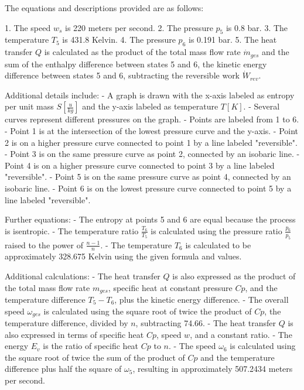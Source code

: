 The equations and descriptions provided are as follows:

1. The speed \( w_s \) is 220 meters per second.
2. The pressure \( p_5 \) is 0.8 bar.
3. The temperature \( T_5 \) is 431.8 Kelvin.
4. The pressure \( p_6 \) is 0.191 bar.
5. The heat transfer \( Q \) is calculated as the product of the total mass flow rate \( \dot{m}_{ges} \) and the sum of the enthalpy difference between states 5 and 6, the kinetic energy difference between states 5 and 6, subtracting the reversible work \( \dot{W}_{rev} \).

Additional details include:
- A graph is drawn with the x-axis labeled as entropy per unit mass \( S \left[ \frac{u}{kg} \right] \) and the y-axis labeled as temperature \( T \left[ K \right] \).
- Several curves represent different pressures on the graph.
- Points are labeled from 1 to 6.
- Point 1 is at the intersection of the lowest pressure curve and the y-axis.
- Point 2 is on a higher pressure curve connected to point 1 by a line labeled "reversible".
- Point 3 is on the same pressure curve as point 2, connected by an isobaric line.
- Point 4 is on a higher pressure curve connected to point 3 by a line labeled "reversible".
- Point 5 is on the same pressure curve as point 4, connected by an isobaric line.
- Point 6 is on the lowest pressure curve connected to point 5 by a line labeled "reversible".

Further equations:
- The entropy at points 5 and 6 are equal because the process is isentropic.
- The temperature ratio \( \frac{T_6}{T_5} \) is calculated using the pressure ratio \( \frac{p_6}{p_5} \) raised to the power of \( \frac{n-1}{n} \).
- The temperature \( T_6 \) is calculated to be approximately 328.675 Kelvin using the given formula and values.

Additional calculations:
- The heat transfer \( Q \) is also expressed as the product of the total mass flow rate \( m_{ges} \), specific heat at constant pressure \( Cp \), and the temperature difference \( T_5 - T_6 \), plus the kinetic energy difference.
- The overall speed \( \omega_{ges} \) is calculated using the square root of twice the product of \( Cp \), the temperature difference, divided by \( n \), subtracting 74.66.
- The heat transfer \( Q \) is also expressed in terms of specific heat \( Cp \), speed \( w \), and a constant ratio.
- The energy \( E_v \) is the ratio of specific heat \( Cp \) to \( n \).
- The speed \( \omega_6 \) is calculated using the square root of twice the sum of the product of \( Cp \) and the temperature difference plus half the square of \( \omega_5 \), resulting in approximately 507.2434 meters per second.
